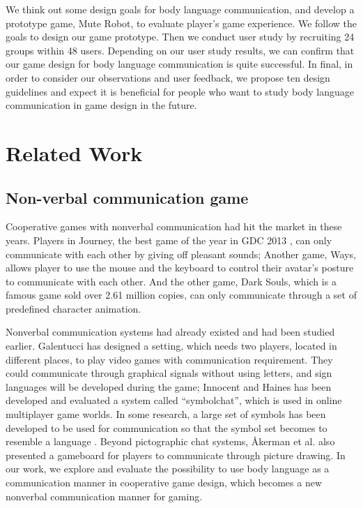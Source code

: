 \documentclass{sigchi}
\begin{document}
We think out some design goals for body language communication, and develop a prototype game, Mute Robot, to evaluate player's game experience. We follow the goals to design our game prototype. Then we conduct user study by recruiting 24 groups within 48 users. Depending on our user study results, we can confirm that our game design for body language communication is quite successful. In final, in order to consider our observations and user feedback, we propose ten design guidelines and expect it is beneficial for people who want to study body language communication in game design in the future. 


\section{Related Work}

\subsection{Non-verbal communication game}

Cooperative games with nonverbal communication had hit the market in these years. Players in Journey, the best game of the year in GDC 2013 \cite{I0}, can only communicate with each other by giving off pleasant sounds; Another game, Ways, allows player to use the mouse and the keyboard to control their avatar's posture to communicate with each other. And the other game, Dark Souls, which is a famous game sold over 2.61 million copies, can only communicate through a set of predefined character animation.

Nonverbal communication systems had already existed and had been studied earlier. 
Galentucci \cite{I1} has designed a setting, which needs two players, located in different places, to play video games with communication requirement.
They could communicate through graphical signals without using letters, and sign languages will be developed during the game; 
Innocent and Haines \cite{I2} has been developed and evaluated a system called ``symbolchat'', which is used in online multiplayer game worlds. In some research, a large set of symbols has been developed to be used for communication so that the symbol set becomes to resemble a language \cite{I3,I4}. Beyond pictographic chat systems, Åkerman et al. \cite{I5} also presented a gameboard for players to communicate through picture drawing. In our work, we explore and evaluate the possibility to use body language as a communication manner in cooperative game design, which becomes a new nonverbal communication manner for gaming.
\end{document}
